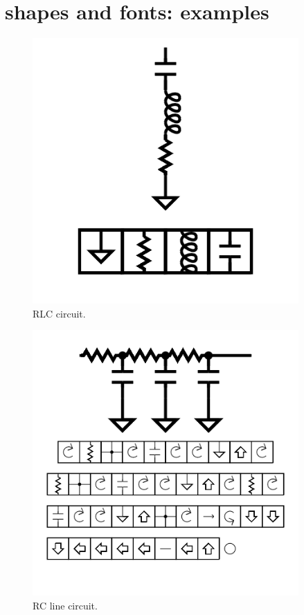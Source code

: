 \section{shapes and fonts: examples}

\begin{figure}
	\centering
	\includegraphics[width=4in]{figures/shapes/rlc.png}
	\caption[RLC]
	{RLC circuit.}
\end{figure}

\begin{figure}
	\centering
	\includegraphics[width=4in]{figures/shapes/rcline.png}
	\caption[RCline]
	{RC line circuit.}
\end{figure}


